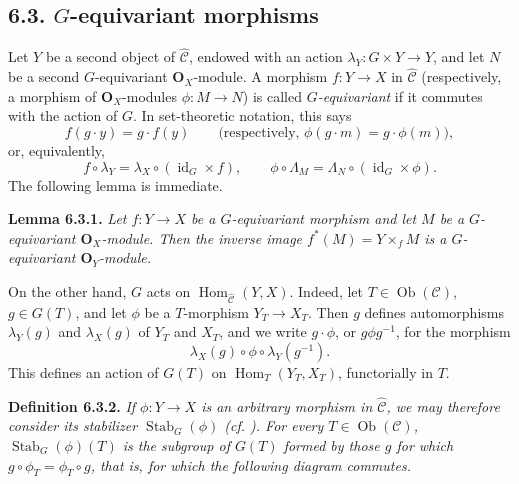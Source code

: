 \subsection*{6.3. \(G\)-equivariant morphisms}

Let \(Y\) be a second object of \(\widehat{\mathscr C}\), endowed with
an action \(\lambda_Y:G\times Y\to Y\), and let \(N\) be a second
\(G\)-equivariant \(\mathbf O_X\)-module. A morphism
\(f:Y\to X\) in \(\widehat{\mathscr C}\) (respectively, a morphism of
\(\mathbf O_X\)-modules \(\phi:M\to N\)) is called
\emph{\(G\)-equivariant} if it commutes with the action of \(G\). In
set-theoretic notation, this says
\[
  f(g\cdot y)=g\cdot f(y)
  \qquad
  \bigl(\text{respectively, }\phi(g\cdot m)=g\cdot\phi(m)\bigr),
\]
or, equivalently,
\[
  f\circ\lambda_Y=\lambda_X\circ(\operatorname{id}_G\times f),
  \qquad
  \phi\circ\Lambda_M=\Lambda_N\circ(\operatorname{id}_G\times\phi).
\]
The following lemma is immediate.

\medskip
\noindent{}\textbf{Lemma 6.3.1.}
\textit{Let \(f:Y\to X\) be a \(G\)-equivariant morphism and let \(M\)
be a \(G\)-equivariant \(\mathbf O_X\)-module. Then the inverse image
\(f^*(M)=Y\times_fM\) is a \(G\)-equivariant
\(\mathbf O_Y\)-module.}

On the other hand, \(G\) acts on
\(\operatorname{Hom}_{\widehat{\mathscr C}}(Y,X)\). Indeed, let
\(T\in\operatorname{Ob}(\mathscr C)\), \(g\in G(T)\), and let \(\phi\)
be a \(T\)-morphism \(Y_T\to X_T\). Then \(g\) defines automorphisms
\(\lambda_Y(g)\) and \(\lambda_X(g)\) of \(Y_T\) and \(X_T\), and we
write \(g\cdot\phi\), or \(g\phi g^{-1}\), for the morphism
\[
  \lambda_X(g)\circ\phi\circ\lambda_Y(g^{-1}).
\]
This defines an action of \(G(T)\) on
\(\operatorname{Hom}_T(Y_T,X_T)\), functorially in \(T\).

\medskip
\noindent{}\textbf{Definition 6.3.2.}
\textit{If \(\phi:Y\to X\) is an arbitrary morphism in
\(\widehat{\mathscr C}\), we may therefore consider its stabilizer
\(\operatorname{Stab}_G(\phi)\) (cf. ). For every
\(T\in\operatorname{Ob}(\mathscr C)\),
\(\operatorname{Stab}_G(\phi)(T)\) is the subgroup of \(G(T)\) formed
by those \(g\) for which \(g\circ\phi_T=\phi_T\circ g\), that is, for
which the following diagram commutes.}

\begin{figure}[H]
  \centering
  
  \label{fig:sga3-exp1-p041-stabilizer-square}
\end{figure}


